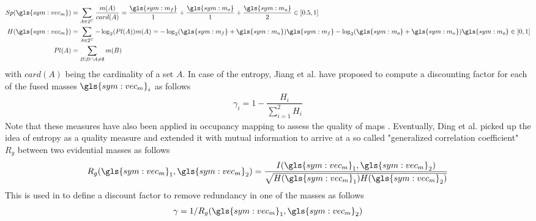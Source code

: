 \begin{align}
	\label{eq:specificity}
	Sp(\gls{sym:vec_m}) &= \sum_{A \in 2^{U}}\dfrac{m(A)}{card(A)}=\dfrac{\gls{sym:m_f}}{1}+\dfrac{\gls{sym:m_o}}{1}+\dfrac{\gls{sym:m_u}}{2} \in [0.5,1]\\
	\label{eq:entropy}
	H(\gls{sym:vec_m}) &= \sum_{A \in 2^{U}} -\log_2(Pl(A))m(A) = -\log_2(\gls{sym:m_f} + \gls{sym:m_u})\gls{sym:m_f} - \log_2(\gls{sym:m_o} + \gls{sym:m_u})\gls{sym:m_o} \in [0,1]\\
	Pl(A) &= \sum_{B|B\cap A \neq \emptyset}m(B)
\end{align}
with $card(A)$ being the cardinality of a set $A$. In case of the entropy, Jiang et al. \cite{jiang2009combination} have proposed to compute a discounting factor for each of the fused masses $\gls{sym:vec_m}_i$ as follows
\begin{align}
	\gamma_i = 1-\dfrac{H_i}{\sum_{i=1}^{2}H_i}
\end{align}
Note that these measures have also been applied in occupancy mapping to assess the quality of maps \cite{yu2015evidential}. Eventually, Ding et al. \cite{ding2002general} picked up the idea of entropy as a quality measure and extended it with mutual information to arrive at a so called "generalized correlation coefficient" $R_g$ between two evidential masses as follows
\begin{align}
	\label{eq:mutual_info_with_entrop}
	R_g(\gls{sym:vec_m}_1,\gls{sym:vec_m}_2) = \dfrac{I(\gls{sym:vec_m}_1,\gls{sym:vec_m}_2)}{\sqrt{H(\gls{sym:vec_m}_1)H(\gls{sym:vec_m}_2)}}
\end{align}
This is used in \cite{su2018research} to define a discount factor to remove redundancy in one of the masses as follows
\begin{align}
	\gamma = 1/R_g(\gls{sym:vec_m}_1,\gls{sym:vec_m}_2)
\end{align}
%
